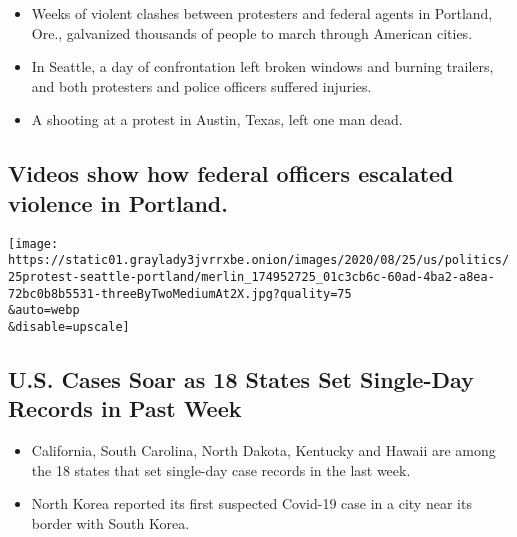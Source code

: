 \begin{itemize}
\tightlist
\item
  Weeks of violent clashes between protesters and federal agents in
  Portland, Ore., galvanized thousands of people to march through
  American cities.
\item
  In Seattle, a day of confrontation left broken windows and burning
  trailers, and both protesters and police officers suffered injuries.
\item
  A shooting at a protest in Austin, Texas, left one man dead.
\end{itemize}

\href{/video/us/100000007243995/portland-protests-federal-government.html}{}

\hypertarget{videos-show-how-federal-officers-escalated-violence-in-portland}{%
\subsection{Videos show how federal officers escalated violence in
Portland.}\label{videos-show-how-federal-officers-escalated-violence-in-portland}}

\href{/2020/07/25/us/protests-seattle-portland.html}{}

\texttt{[image: https://static01.graylady3jvrrxbe.onion/images/2020/08/25/us/politics/25protest-seattle-portland/merlin\_174952725\_01c3cb6c-60ad-4ba2-a8ea-72bc0b8b5531-threeByTwoMediumAt2X.jpg?quality=75\\\&auto=webp\\\&disable=upscale]}

\href{/2020/07/25/world/coronavirus-covid-19.html}{}

\hypertarget{us-cases-soar-as-18-states-set-single-day-records-in-past-week}{%
\subsection{U.S. Cases Soar as 18 States Set Single-Day Records in Past
Week}\label{us-cases-soar-as-18-states-set-single-day-records-in-past-week}}

\begin{itemize}
\tightlist
\item
  California, South Carolina, North Dakota, Kentucky and Hawaii are
  among the 18 states that set single-day case records in the last week.
\item
  North Korea reported its first suspected Covid-19 case in a city near
  its border with South Korea.
\end{itemize}

\href{/2020/07/25/business/coronavirus-vaccine-profits-vaxart.html}{}

